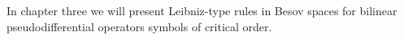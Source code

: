 In chapter three we will present Leibniz-type rules in Besov spaces for bilinear pseudodifferential operators symbols of critical order.

%
%
%



